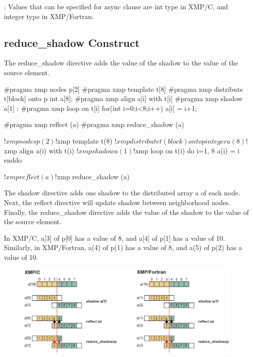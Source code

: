 \noindent\hrulefill

\noindent\hrulefill

: Values that can be specified for async clause are
int type in XMP/C, and
integer type in XMP/Fortran.

\noindent\hrulefill


\subsection{{\bf reduce\_shadow} Construct}

The reduce\_shadow directive adds the value of the shadow to the value of
the source element.

\begin{XCexample}
#pragma xmp nodes p[2]
#pragma xmp template t[8]
#pragma xmp distribute t[block] onto p
int a[8];
#pragma xmp align a[i] with t[i]
#pragma xmp shadow a[1]
 :
#pragma xmp loop on t[i]
  for(int i=0;i<8;i++)
    a[i] = i+1;

#pragma xmp reflect (a)
#pragma xmp reduce_shadow (a)
\end{XCexample}

\begin{XFexample}
!$xmp nodes p(2)
!$xmp template t(8)
!$xmp distribute t(block) onto p
  integer a(8)
!$xmp align a(i) with t(i)
!$xmp shadow a(1)

!$xmp loop on t(i)
  do i=1, 8
    a(i) = i
  enddo

!$xmp reflect (a)
!$xmp reduce_shadow (a)
\end{XFexample}

The shadow directive adds one shadow to the distributed array a of each
node. Next, the reflect directive will update shadow between
neighborhood nodes. Finally, the reduce\_shadow directive adds the value
of the shadow to the value of the source element.

In XMP/C, a[3] of p[0] has a value of 8, and a[4] of p[1] has a value of
10. Similarly, in XMP/Fortran, a(4) of p(1) has a value of 8, and a(5)
of p(2) has a value of 10.

\begin{figure}
  \centering
  \includegraphics{figs/reduce_shadow.png}
\end{figure}

